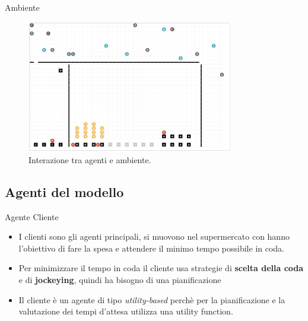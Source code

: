 \begin{frame}{Ambiente}
	\begin{figure}[H]
		\centering
		\includegraphics[width=9cm]{"../report/images/supermarket-execution.png"}
		\caption{Interazione tra agenti e ambiente.}
		\label{fig:supermarket_execution}
	\end{figure}	
\end{frame}


\subsection{Agenti del modello}

\begin{frame}{Agente Cliente}
	\begin{itemize}
		\item I clienti sono gli agenti principali, si muovono nel supermercato con hanno l'obiettivo di fare la spesa e attendere il minimo tempo possibile in coda.
		\item Per minimizzare il tempo in coda il cliente usa strategie di \textbf{scelta della coda} e di \textbf{jockeying}, quindi ha bisogno di una pianificazione
		\item Il cliente è un agente di tipo \textit{utility-based} perchè per la pianificazione e la valutazione dei tempi d'attesa utilizza una utility function. 
	\end{itemize}
\end{frame}

